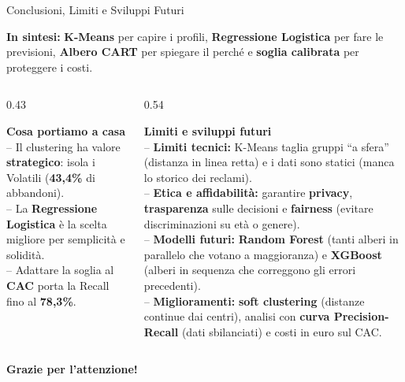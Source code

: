 \documentclass[aspectratio=169, 10pt]{beamer}
\newcommand{\card}[3]{%
    \colorbox{#1}{\parbox{\dimexpr#2-2\fboxsep\relax}{\raggedright #3}}%
}
\begin{document}
\begin{frame}{Conclusioni, Limiti e Sviluppi Futuri}
    \card{CardBlue}{\textwidth}{\footnotesize
        \textbf{\color{PrimaryNavy} In sintesi:} \textbf{K-Means} per capire i profili, \textbf{Regressione Logistica} per fare le previsioni, \textbf{Albero CART} per spiegare il perché e \textbf{soglia calibrata} per proteggere i costi.
    }

    \vspace{2.4mm}
    \begin{columns}[T, onlytextwidth]
        \begin{column}{0.43\textwidth}
            \card{CardGreen}{\linewidth}{\footnotesize
                \textbf{\color{AccentGreen}\small Cosa portiamo a casa}\\[3pt]
                -- Il clustering ha valore \textbf{strategico}: isola i Volatili (\textbf{43,4\%} di abbandoni).\\[3pt]
                -- La \textbf{Regressione Logistica} è la scelta migliore per semplicità e solidità.\\[3pt]
                -- Adattare la soglia al \textbf{CAC} porta la Recall fino al \textbf{78,3\%}.
            }
        \end{column}

        \begin{column}{0.54\textwidth}
            \card{CardAmber}{\linewidth}{\scriptsize
                \textbf{\color{AccentAmber}\small Limiti e sviluppi futuri}\\[2.2pt]
                -- \textbf{Limiti tecnici:} K-Means taglia gruppi ``a sfera'' (distanza in linea retta) e i dati sono statici (manca lo storico dei reclami).\\[2.2pt]
                -- \textbf{Etica e affidabilità:} garantire \textbf{privacy}, \textbf{trasparenza} sulle decisioni e \textbf{fairness} (evitare discriminazioni su età o genere).\\[2.2pt]
                -- \textbf{Modelli futuri:} \textbf{Random Forest} (tanti alberi in parallelo che votano a maggioranza) e \textbf{XGBoost} (alberi in sequenza che correggono gli errori precedenti).\\[2.2pt]
                -- \textbf{Miglioramenti:} \textbf{soft clustering} (distanze continue dai centri), analisi con \textbf{curva Precision-Recall} (dati sbilanciati) e costi in euro sul CAC.
            }
        \end{column}
    \end{columns}

    \vspace{3mm}
    \centering
    \colorbox{PrimaryNavy}{\parbox{0.98\textwidth}{\centering\vspace{1.5pt}
        \normalsize \color{white} \textbf{Grazie per l'attenzione!}
    \vspace{1.5pt}}}
\end{frame}
\end{document}
